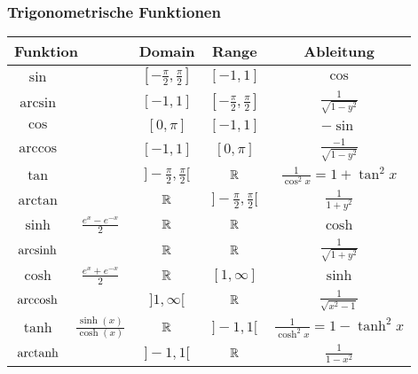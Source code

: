 \subsubsection{Trigonometrische Funktionen}
\begin{tabular}{c | c | c | c | c}
    \multicolumn{2}{l|}{Funktion} & Domain                      & Range                             & Ableitung\\\hline
    $\sin$                        &                             & $[-\frac{\pi}{2}, \frac{\pi}{2}]$ & $[-1, 1]$                          & $\cos$\\\hline
    $\arcsin$                     &                             & $[-1, 1]$                         & $[-\frac{\pi}{2}, \frac{\pi}{2}]$  & $\frac{1}{\sqrt{1-y^2} }$\\\hline
    $\cos$                        &                             & $[0, \pi]$                        & $[-1, 1]$                          & $-\sin$\\\hline
    $\arccos$                     &                             & $[-1, 1]$                         & $[0, \pi]$                         & $\frac{-1}{\sqrt{1-y^2} }$\\\hline
    $\tan$                        &                             & $]-\frac{\pi}{2}, \frac{\pi}{2}[$ & $ \mathbb{R}$                              & $\frac{1}{\cos^2x} = 1 + \tan^2x$\\\hline
    $\arctan$                     &                             & $ \mathbb{R}$                             & $]- \frac{\pi}{2}, \frac{\pi}{2}[$ & $\frac{1}{1+y^2}$\\\hline
    $\sinh$                       & $\frac{e^x - e^{-x}}{2}$    & $\mathbb{R}$                              & $\mathbb{R}$                               & $\cosh$\\\hline
    $\operatorname{arcsinh}$                    &                             & $\mathbb{R}$                              & $\mathbb{R}$                               & $\frac{1}{\sqrt{1+y^2} }$\\\hline
    $\cosh$                       & $\frac{e^x+e^{-x}}{2}$      & $\mathbb{R}$                              & $[1,\infty]$                       & $\sinh$\\\hline
    $\operatorname{arccosh}$                    &                             & $]1,\infty[$                      & $\mathbb{R}$                               & $\frac{1}{\sqrt{x^2-1}}$\\\hline
    $\tanh$                       & $\frac{\sinh(x)}{\cosh(x)}$ & $\mathbb{R}$                              & $]-1,1[$                           & $\frac{1}{\cosh^2x} = 1 - \tanh^2x$\\\hline
    $\operatorname{arctanh}$                    &                             & $]-1, 1[$                         & $\mathbb{R}$                               & $\frac{1}{1-x^2}$\\\hline
\end{tabular}


